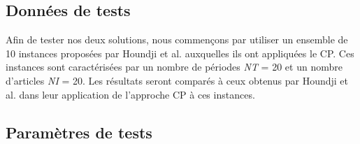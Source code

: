 \documentclass[12pt,a4paper]{article}
\begin{document}
		\subsection{Données de tests}
		
		Afin de tester nos deux solutions, nous commençons par utiliser un ensemble de 10 instances proposées par Houndji et al. auxquelles ils ont appliquées le CP. Ces instances sont caractérisées par un nombre de périodes \emph{NT} = 20 et un nombre d'articles \emph{NI} = 20. Les résultats seront comparés à ceux obtenus par Houndji et al. dans leur application de l'approche CP à ces instances. %
		
		\subsection{Paramètres de tests}
		
\end{document}
